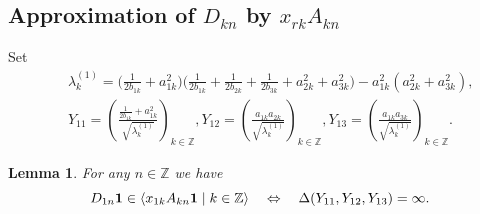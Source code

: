 \documentclass[preprint,12pt]{elsarticle}
\newtheorem{lem}[thm]{Lemma}
\numberwithin{equation}{section}
\begin{document}
\subsection{Approximation of $D_{kn}$ by $x_{rk}A_{kn}$}
Set
\begin{eqnarray}
\label{lambda(1)}
&&\lambda_k^{(1)}\!=\!\Big(\frac{1}{2b_{1k}}\!+\!a_{1k}^2\Big)\Big(\frac{1}{2b_{1k}}\!+\!\frac{1}{2b_{2k}}\!+\!\frac{1}{2b_{3k}}
\!+\!a_{2k}^2+a_{3k}^2\Big)\!-\!
a_{1k}^2(a_{2k}^2\!+\!a_{3k}^2),\\
\label{y_1(123)}
&&Y_{11}\!=\!\left(
\frac{\frac{1}{2b_{1k}}\!+\!a_{1k}^2}
{\sqrt{\lambda_k^{(1)}}}
\right)_{k\in \mathbb Z},
Y_{12}\!=\!\left(\frac{a_{1k}a_{2k}}{\sqrt{\lambda_k^{(1)}}}\right)_{k\in \mathbb Z},
Y_{13}\!=\!\left(\frac{a_{1k}a_{3k}}{\sqrt{\lambda_k^{(1)}}}\right)_{k\in \mathbb Z}.
\end{eqnarray}
%
\begin{lem}
\label{dx1.3}
For any  $n\in {\mathbb Z}$ we have
$$
D_{1n}{\bf 1}\in\langle x_{1k}A_{kn}{\bf 1}\mid k\in {\mathbb Z}\rangle
\quad\Leftrightarrow\quad 
\Delta(Y_{11},Y_{12},Y_{13})=\infty.
$$
\end{lem}
%
\end{document}
